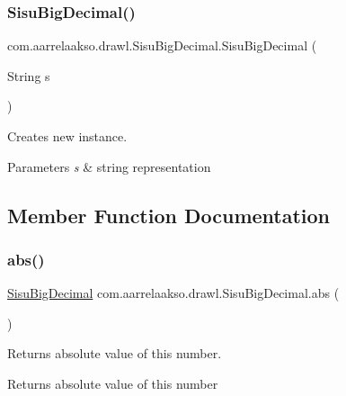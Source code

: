 \subsubsection{\texorpdfstring{Sisu\+Big\+Decimal()}{SisuBigDecimal()}\hspace{0.1cm}{\footnotesize\ttfamily [3/3]}}
{\footnotesize\ttfamily com.\+aarrelaakso.\+drawl.\+Sisu\+Big\+Decimal.\+Sisu\+Big\+Decimal (\begin{DoxyParamCaption}\item[{String}]{s }\end{DoxyParamCaption})\hspace{0.3cm}{\ttfamily [private]}}



Creates new instance. 


\begin{DoxyParams}{Parameters}
{\em s} & string representation \\
\hline
\end{DoxyParams}


\subsection{Member Function Documentation}
\mbox{\label{classcom_1_1aarrelaakso_1_1drawl_1_1_sisu_big_decimal_a7b9d58fa45206483a9ca603c118d7fae}} 
\subsubsection{\texorpdfstring{abs()}{abs()}}
{\footnotesize\ttfamily \hyperlink{classcom_1_1aarrelaakso_1_1drawl_1_1_sisu_big_decimal}{Sisu\+Big\+Decimal} com.\+aarrelaakso.\+drawl.\+Sisu\+Big\+Decimal.\+abs (\begin{DoxyParamCaption}{ }\end{DoxyParamCaption})\hspace{0.3cm}{\ttfamily [protected]}}



Returns absolute value of this number. 

\begin{DoxyReturn}{Returns}
absolute value of this number 
\end{DoxyReturn}
\mbox{\label{classcom_1_1aarrelaakso_1_1drawl_1_1_sisu_big_decimal_aed9db04cdf1516cc87d0599b99fb6b02}} 
